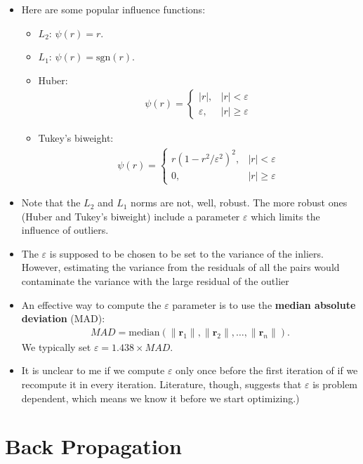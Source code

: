 \documentclass[10pt]{article}
\newcommand{\ve}[1]{\mathbf{#1}}
\begin{document}
\begin{itemize}
    \item Here are some popular influence functions:
      \begin{itemize}
        \item $L_2$: $\psi(r) = r$.
        \item $L_1$: $\psi(r) = \mathrm{sgn}(r)$.
        \item Huber:
          \begin{align*}
            \psi(r) = \begin{cases}
              |r|, & |r| < \varepsilon\\
              \varepsilon, & |r| \geq \varepsilon
            \end{cases}            
          \end{align*}
        \item Tukey's biweight:
          \begin{align*}
            \psi(r) = \begin{cases}
              r (1 - r^2 / \varepsilon^2)^2, & |r| < \varepsilon\\
              0, & |r| \geq \varepsilon
            \end{cases}
          \end{align*}
      \end{itemize}
    \item Note that the $L_2$ and $L_1$ norms are not, well, robust.
      The more robust ones (Huber and Tukey's biweight) include
      a parameter $\varepsilon$ which limits the influence of outliers.
      
    \item The $\varepsilon$ is supposed to be chosen to be set to
      the variance of the inliers. However, estimating the variance
      from the residuals of all the pairs would contaminate
      the variance with the large residual of the outlier
      
    \item An effective way to compute the $\varepsilon$ parameter is
      to use the {\bf median absolute deviation} (MAD):
      \begin{align*}
        MAD = \mathrm{median}(\| \ve{r}_1 \|, \| \ve{r}_2 \|, \dotsc, \| \ve{r}_n \|).
      \end{align*}
      We typically set $\varepsilon = 1.438 \times MAD$.
      
    \item It is unclear to me if we compute $\varepsilon$ only once
       before the first iteration of if we recompute it in every
       iteration. Literature, though, suggests that $\varepsilon$ is problem
       dependent, which means we know it before we start optimizing.)      
  \end{itemize}
  
  \section{Back Propagation}
\end{document}
